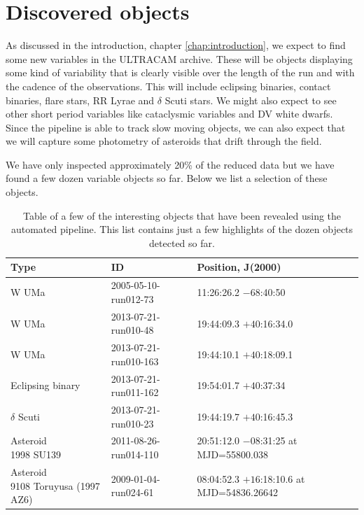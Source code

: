 \section{Discovered objects}
As discussed in the introduction, chapter \ref{chap:introduction}, we expect to find some new variables in the ULTRACAM archive. These will be objects displaying some kind of variability that is clearly visible over the length of the run and with the cadence of the observations. This will include eclipsing binaries, contact binaries, flare stars, RR Lyrae and $\delta$ Scuti stars. We might also expect to see other short period variables like cataclysmic variables and DV white dwarfs. Since the pipeline is able to track slow moving objects, we can also expect that we will capture some photometry of asteroids that drift through the field.   

We have only inspected approximately 20\% of the reduced data but we have found a few dozen variable objects so far. Below we list a selection of these objects. 

\begin{table}
  \caption{Table of a few of the interesting objects that have been revealed using the automated pipeline. This list contains just a few highlights of the dozen objects detected so far.}
  \begin{tabularx}{15.4cm}{ l  l  l }
  \hline
  Type& ID & Position, J(2000) \\
  \hline
    {W UMa} & 2005-05-10-run012-73 & 11:26:26.2 $-68$:40:50 \\
    {W UMa} & 2013-07-21-run010-48 & 19:44:09.3 $+40$:16:34.0\\
    {W UMa} & 2013-07-21-run010-163 & 19:44:10.1 $+40$:18:09.1\\
    Eclipsing binary & 2013-07-21-run011-162 & 19:54:01.7 $+40$:37:34\\
    $\delta$ Scuti & 2013-07-21-run010-23 & 19:44:19.7 $+40$:16:45.3\\
  \hline
    \parbox[c]{5cm}{Asteroid\\1998 SU139\\ } & \parbox[c]{5cm}{2011-08-26-run014-110\\  } & \parbox[c]{5cm}{20:51:12.0 $-08$:31:25\\ at MJD=55800.038}\\
    \parbox[c]{5cm}{Asteroid\\9108 Toruyusa (1997 AZ6) } & \parbox[c]{5cm}{2009-01-04-run024-61\\}& \parbox[c]{5cm}{08:04:52.3 $+16$:18:10.6\\at  MJD=54836.26642}\\

  \hline
  \end{tabularx}
  \label{tab:newobjects}
\end{table}


